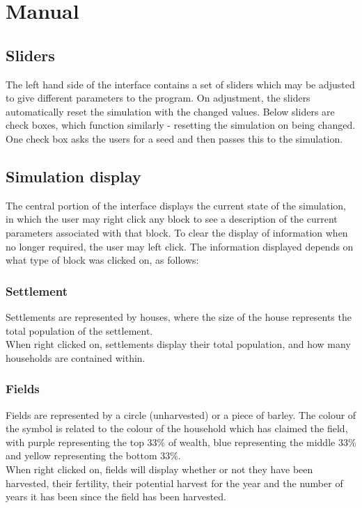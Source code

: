 \documentclass[12pt]{article}
\begin{document}
	\begin{thebibliography}{9}
		
	\end{thebibliography}

	\appendix
	\section{Manual}
		\subsection{Sliders}
			The left hand side of the interface contains a set of sliders which may be adjusted to give different parameters to the program. On adjustment, the sliders automatically reset the simulation with the changed values. Below sliders are check boxes, which function similarly - resetting the simulation on being changed. One check box asks the users for a seed and then passes this to the simulation.
		
		\subsection{Simulation display}
			The central portion of the interface displays the current state of the simulation, in which the user may right click any block to see a description of the current parameters associated with that block. To clear the display of information when no longer required, the user may left click. The information displayed depends on what type of block was clicked on, as follows:
			\subsubsection{Settlement}
				Settlements are represented by houses, where the size of the house represents the total population of the settlement.\\
				When right clicked on, settlements display their total population, and how many households are contained within.\\
			\subsubsection{Fields}
				Fields are represented by a circle (unharvested) or a piece of barley. The colour of the symbol is related to the colour of the household which has claimed the field, with purple representing the top 33\% of wealth, blue representing the middle 33\% and yellow representing the bottom 33\%.\\
				When right clicked on, fields will display whether or not they have been harvested, their fertility, their potential harvest for the year and the number of years it has been since the field has been harvested.\\
\end{document}
